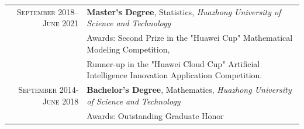 %
%



\begin{tabular}{rl}	
	\textsc{September 2018–June 2021}			  & \textbf{Master's Degree}, Statistics, \emph{Huazhong University of Science and Technology}\\
	  	                            &  Awards: Second Prize in the "Huawei Cup" Mathematical Modeling Competition,\\
                                    & Runner-up in the "Huawei Cloud Cup" Artificial Intelligence Innovation Application Competition.\\
	\textsc{September 2014-June 2018} 	&  \textbf{Bachelor's Degree}, Mathematics, \emph{Huazhong University of Science and Technology}\\
									&  Awards: Outstanding Graduate Honor\\
\end{tabular}